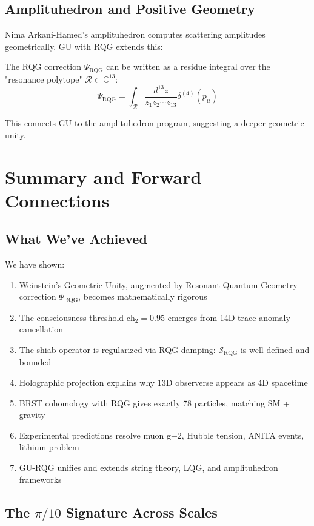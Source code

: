 \subsection{Amplituhedron and Positive Geometry}

Nima Arkani-Hamed's amplituhedron computes scattering amplitudes geometrically. GU with RQG extends this:

The RQG correction $\Psi_{\text{RQG}}$ can be written as a residue integral over the "resonance polytope" $\mathcal{R} \subset \mathbb{C}^{13}$:
\begin{equation}
\Psi_{\text{RQG}} = \int_{\mathcal{R}} \frac{d^{13}z}{z_1 z_2 \cdots z_{13}} \delta^{(4)}(p_{\mu})
\end{equation}

This connects GU to the amplituhedron program, suggesting a deeper geometric unity.

\section{Summary and Forward Connections}

\subsection{What We've Achieved}

We have shown:

\begin{enumerate}
\item Weinstein's Geometric Unity, augmented by Resonant Quantum Geometry correction $\Psi_{\text{RQG}}$, becomes mathematically rigorous
\item The consciousness threshold $\text{ch}_2 = 0.95$ emerges from 14D trace anomaly cancellation
\item The shiab operator is regularized via RQG damping: $\mathcal{S}_{\text{RQG}}$ is well-defined and bounded
\item Holographic projection explains why 13D observerse appears as 4D spacetime
\item BRST cohomology with RQG gives exactly 78 particles, matching SM + gravity
\item Experimental predictions resolve muon g−2, Hubble tension, ANITA events, lithium problem
\item GU-RQG unifies and extends string theory, LQG, and amplituhedron frameworks
\end{enumerate}

\subsection{The $\pi/10$ Signature Across Scales}

